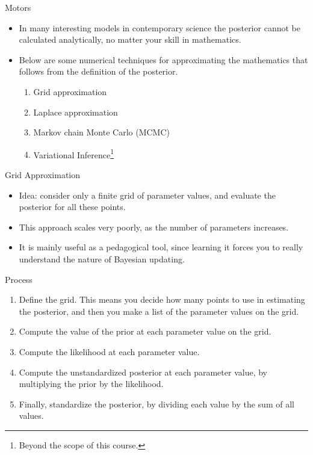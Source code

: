 \documentclass[handout]{beamer}
\begin{document}
\begin{frame}{Motors}
\scriptsize{

\begin{itemize}
\item In many interesting models in contemporary science the posterior cannot be calculated analytically, no matter your
skill in mathematics.

\item Below are some numerical techniques for approximating the mathematics that follows from the definition of the posterior.

\begin{enumerate}
 \item Grid approximation
 \item Laplace approximation
 \item Markov chain Monte Carlo (MCMC)
 \item Variational Inference\footnote{Beyond the scope of this course.}
\end{enumerate}

\end{itemize}



} 
\end{frame}



\begin{frame}{Grid Approximation}
\scriptsize{

\begin{itemize}

\item Idea: consider only a finite grid of parameter values, and evaluate the posterior for all these points.


\item This approach scales very poorly, as the number of parameters increases.


\item It is mainly useful as a pedagogical tool, since learning it forces you to really understand the nature of Bayesian updating.


\end{itemize}

\begin{block}{Process}
\begin{enumerate}

  \item Define the grid. This means you decide how many points to use in estimating the posterior, and then you make a list of the parameter values on the grid.
\item Compute the value of the prior at each parameter value on the grid.
\item Compute the likelihood at each parameter value.
\item Compute the unstandardized posterior at each parameter value, by multiplying the prior by the likelihood.
\item  Finally, standardize the posterior, by dividing each value by the sum of all values.
\end{enumerate}
\end{block}

} 


\end{frame}
\end{document}
